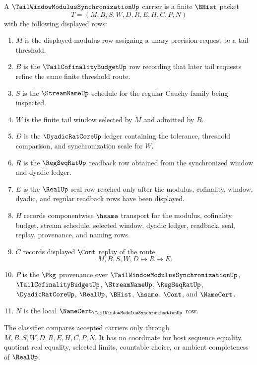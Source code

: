 \begin{definition}
\label{def:tail-window-modulus-synchronization-carrier}
A $\TailWindowModulusSynchronizationUp$ carrier is a finite $\BHist$ packet
$$
T=(M,B,S,W,D,R,E,H,C,P,N)
$$
with the following displayed rows:
\begin{enumerate}
\item $M$ is the displayed modulus row assigning a unary precision request to a tail threshold.
\item $B$ is the $\TailCofinalityBudgetUp$ row recording that later tail requests refine the same finite threshold route.
\item $S$ is the $\StreamNameUp$ schedule for the regular Cauchy family being inspected.
\item $W$ is the finite tail window selected by $M$ and admitted by $B$.
\item $D$ is the $\DyadicRatCoreUp$ ledger containing the tolerance, threshold comparison, and synchronization scale for $W$.
\item $R$ is the $\RegSeqRatUp$ readback row obtained from the synchronized window and dyadic ledger.
\item $E$ is the $\RealUp$ seal row reached only after the modulus, cofinality, window, dyadic, and regular readback rows have been displayed.
\item $H$ records componentwise $\hsame$ transport for the modulus, cofinality budget, stream schedule, selected window, dyadic ledger, readback, seal, replay, provenance, and naming rows.
\item $C$ records displayed $\Cont$ replay of the route
$$
M,B,S,W,D \longmapsto R \longmapsto E .
$$
\item $P$ is the $\Pkg$ provenance over $\TailWindowModulusSynchronizationUp$, $\TailCofinalityBudgetUp$, $\StreamNameUp$, $\RegSeqRatUp$, $\DyadicRatCoreUp$, $\RealUp$, $\BHist$, $\hsame$, $\Cont$, and $\NameCert$.
\item $N$ is the local $\NameCert_{\TailWindowModulusSynchronizationUp}$ row.
\end{enumerate}
The classifier compares accepted carriers only through $M,B,S,W,D,R,E,H,C,P,N$. It has no coordinate for host sequence equality, quotient real equality, selected limits, countable choice, or ambient completeness of $\RealUp$.
\end{definition}

